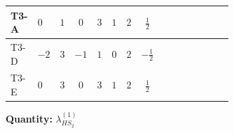 \documentclass[8pt]{article}
\begin{document}
\begin{landscape}
\begin{longtable}{@{}llcccccc >{\raggedright\arraybackslash}p{0.21\linewidth} >{\raggedright\arraybackslash}p{0.21\linewidth} >{\raggedright\arraybackslash}p{0.21\linewidth}@{}}
\midrule
T3-A & $0$ & $1$ & $0$ & $3$ & $1$ & $2$ & $\frac{1}{2}$ & \scriptsize\adjustbox{max width=\linewidth}{$\begin{gathered} +6 {\lambda_1} {\lambda_{HS_2}^{(1)}}\end{gathered}$} & \scriptsize\adjustbox{max width=\linewidth}{$\begin{gathered} +4 {\lambda_{HS_2}^{(1)}}^2\end{gathered}$} & \scriptsize\adjustbox{max width=\linewidth}{$\begin{gathered} +8 {\lambda_{HS_2}^{(1)}} {\lambda_{S_2}^{(1)}}\end{gathered}$} \\
\midrule
T3-D & $-2$ & $3$ & $-1$ & $1$ & $0$ & $2$ & $-\frac{1}{2}$ & \scriptsize\adjustbox{max width=\linewidth}{$\begin{gathered} +6 {\lambda_1} {\lambda_{HS_2}^{(1)}}\end{gathered}$} & \scriptsize\adjustbox{max width=\linewidth}{$\begin{gathered} +4 {\lambda_{HS_2}^{(1)}}^2\end{gathered}$} & \scriptsize\adjustbox{max width=\linewidth}{$\begin{gathered} +4 {\lambda_{HS_2}^{(1)}} {\lambda_{S_2}^{(1)}}\end{gathered}$} \\
\midrule
T3-E & $0$ & $3$ & $0$ & $3$ & $1$ & $2$ & $\frac{1}{2}$ & \scriptsize\adjustbox{max width=\linewidth}{$\begin{gathered} +6 {\lambda_1} {\lambda_{HS_2}^{(1)}}\end{gathered}$} & \scriptsize\adjustbox{max width=\linewidth}{$\begin{gathered} +4 {\lambda_{HS_2}^{(1)}}^2\end{gathered}$} & \scriptsize\adjustbox{max width=\linewidth}{$\begin{gathered} +8 {\lambda_{HS_2}^{(1)}} {\lambda_{S_2}^{(1)}}\end{gathered}$} \\
\midrule
\bottomrule
\end{longtable}
\clearpage
\noindent\textbf{Quantity: }$\lambda_{HS_2}^{(1)}$\par\smallskip

\end{landscape}
\end{document}
